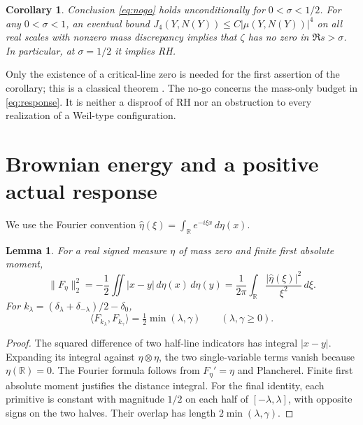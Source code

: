 \documentclass[11pt,a4paper]{article}
\newtheorem{lemma}[theorem]{Lemma}
\newtheorem{corollary}[theorem]{Corollary}
\theoremstyle{definition}
\theoremstyle{remark}
\newcommand{\RR}{\mathbb R}
\newcommand{\dd}{\,d}
\begin{document}
\begin{corollary}\label{cor:rh}
Conclusion \eqref{eq:nogo} holds unconditionally for \(0<\sigma<1/2\).
For any \(0<\sigma<1\), an eventual bound
\(J_4(Y,N(Y))\le C|\mu(Y,N(Y))|^4\) on all real scales with nonzero
mass discrepancy implies that \(\zeta\) has no zero in \(\Re s>\sigma\).
In particular, at \(\sigma=1/2\) it implies RH.
\end{corollary}

Only the existence of a critical-line zero is needed for the first
assertion of the corollary; this is a classical theorem
\cite{DLMF}. The no-go concerns the mass-only budget in
\eqref{eq:response}. It is neither a disproof of RH nor an obstruction
to every realization of a Weil-type configuration.

\section{Brownian energy and a positive actual response}

We use the Fourier convention
\(\widehat\eta(\xi)=\int_{\RR}e^{-i\xi x}\dd\eta(x)\).

\begin{lemma}\label{lem:energy}
For a real signed measure \(\eta\) of mass zero and finite first
absolute moment,
\begin{equation}
 \|F_\eta\|_2^2
 =-\frac12\iint |x-y|\dd\eta(x)\dd\eta(y)
 =\frac1{2\pi}\int_\RR\frac{|\widehat\eta(\xi)|^2}{\xi^2}\dd\xi.
 \label{eq:energy}
\end{equation}
For \(k_\lambda=(\delta_\lambda+\delta_{-\lambda})/2-\delta_0\),
\[
 \langle F_{k_\lambda},F_{k_\gamma}\rangle
 =\tfrac12\min(\lambda,\gamma)\qquad(\lambda,\gamma\ge0).
\]
\end{lemma}
\begin{proof}
The squared difference of two half-line indicators has integral
\(|x-y|\). Expanding its integral against \(\eta\otimes\eta\), the two
single-variable terms vanish because \(\eta(\RR)=0\).
The Fourier formula follows from \(F_\eta'=\eta\) and Plancherel.
Finite first absolute moment justifies the distance integral.
For the final identity, each primitive is constant with magnitude
\(1/2\) on each half of \([-\lambda,\lambda]\), with opposite signs
on the two halves. Their overlap has length \(2\min(\lambda,\gamma)\).
\end{proof}
\end{document}
